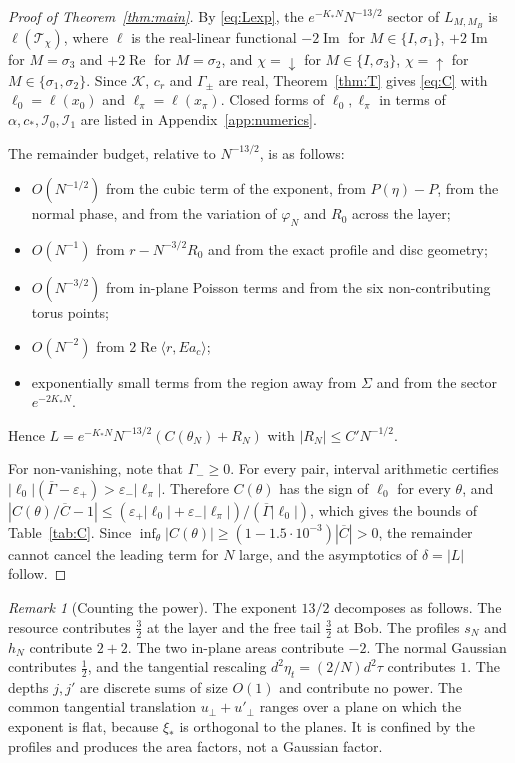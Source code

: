 \documentclass[11pt]{amsart}
\theoremstyle{definition}
\theoremstyle{remark}
\newtheorem{remark}[theorem]{Remark}
\newcommand{\cK}{\mathcal{K}}
\newcommand{\up}{{\uparrow}}
\newcommand{\dn}{{\downarrow}}
\newcommand{\re}{\operatorname{Re}}
\newcommand{\im}{\operatorname{Im}}
\begin{document}
\begin{proof}[Proof of Theorem~\ref{thm:main}]
By \eqref{eq:Lexp}, the $e^{-K_*N}N^{-13/2}$ sector of $L_{M,M_B}$ is
$\ell(\mathcal T_\chi)$, where $\ell$ is the real-linear functional
$-2\im$ for $M\in\{I,\sigma_1\}$, $+2\im$ for $M=\sigma_3$ and $+2\re$ for
$M=\sigma_2$, and $\chi=\dn$ for $M\in\{I,\sigma_3\}$, $\chi=\up$ for
$M\in\{\sigma_1,\sigma_2\}$.  Since $\cK$, $c_r$ and $\Gamma_\pm$ are real,
Theorem~\ref{thm:T} gives \eqref{eq:C} with $\ell_0=\ell(x_0)$ and
$\ell_\pi=\ell(x_\pi)$.  Closed forms of $\ell_0,\ell_\pi$ in terms of
$\alpha,c_*,\mathcal I_0,\mathcal I_1$ are listed in
Appendix~\ref{app:numerics}.

The remainder budget, relative to $N^{-13/2}$, is as follows:
\begin{itemize}
\item $O(N^{-1/2})$ from the cubic term of the exponent, from
  $P(\eta)-P$, from the normal phase, and from the variation of
  $\varphi_N$ and $R_0$ across the layer;
\item $O(N^{-1})$ from $r-N^{-3/2}R_0$ and from the exact profile and disc
  geometry;
\item $O(N^{-3/2})$ from in-plane Poisson terms and from the six
  non-contributing torus points;
\item $O(N^{-2})$ from $2\re\langle r,Ea_c\rangle$;
\item exponentially small terms from the region away from $\Sigma$ and from
  the sector $e^{-2K_*N}$.
\end{itemize}
Hence $L=e^{-K_*N}N^{-13/2}(C(\theta_N)+R_N)$ with $|R_N|\le C'N^{-1/2}$.

For non-vanishing, note that $\Gamma_-\ge0$.  For every pair, interval
arithmetic certifies $|\ell_0|(\overline\Gamma-\varepsilon_+)>\varepsilon_-|\ell_\pi|$.
Therefore $C(\theta)$ has the sign of $\ell_0$ for every $\theta$, and
$|C(\theta)/\overline C-1|\le(\varepsilon_+|\ell_0|+\varepsilon_-|\ell_\pi|)/(\overline\Gamma|\ell_0|)$,
which gives the bounds of Table~\ref{tab:C}.  Since
$\inf_\theta|C(\theta)|\ge(1-1.5\cdot10^{-3})|\overline C|>0$, the remainder
cannot cancel the leading term for $N$ large, and the asymptotics of
$\delta=|L|$ follow.
\end{proof}

\begin{remark}[Counting the power]
The exponent $13/2$ decomposes as follows.  The resource contributes
$\frac32$ at the layer and the free tail $\frac32$ at Bob.  The profiles
$s_N$ and $h_N$ contribute $2+2$.  The two in-plane areas contribute $-2$.
The normal Gaussian contributes $\frac12$, and the tangential rescaling
$d^2\eta_t=(2/N)d^2\tau$ contributes $1$.  The depths $j,j'$ are discrete
sums of size $O(1)$ and contribute no power.  The common tangential
translation $u_\perp+u'_\perp$ ranges over a plane on which the exponent
is flat, because $\xi_*$ is orthogonal to the planes.  It is confined by the profiles and
produces the area factors, not a Gaussian factor.
\end{remark}
\end{document}
